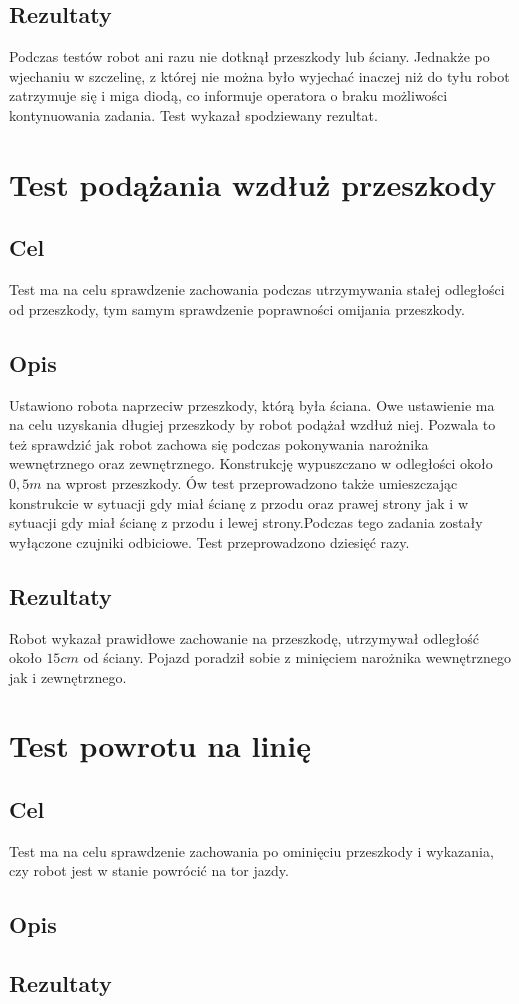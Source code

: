 \subsection{Rezultaty}
Podczas testów robot ani razu nie dotknął przeszkody lub ściany. Jednakże po wjechaniu w szczelinę, z której nie można było wyjechać inaczej niż do tyłu robot zatrzymuje się i miga diodą, co informuje operatora o braku możliwości kontynuowania zadania. Test wykazał spodziewany rezultat.

\section{Test podążania wzdłuż przeszkody}
\subsection{Cel}
Test ma na celu sprawdzenie zachowania podczas utrzymywania stałej odległości od przeszkody, tym samym sprawdzenie poprawności omijania przeszkody.
\subsection{Opis}
Ustawiono robota naprzeciw przeszkody, którą była ściana. Owe ustawienie ma na celu uzyskania długiej przeszkody by robot podążał wzdłuż niej. Pozwala to też sprawdzić jak robot zachowa się podczas pokonywania narożnika wewnętrznego oraz zewnętrznego. Konstrukcję wypuszczano w odległości około $0,5m$ na wprost przeszkody. Ów test przeprowadzono także umieszczając konstrukcie w sytuacji gdy miał ścianę z przodu oraz prawej strony jak i w sytuacji gdy miał ścianę z przodu i lewej strony.Podczas tego zadania zostały wyłączone czujniki odbiciowe. Test przeprowadzono dziesięć razy.
\subsection{Rezultaty}
Robot wykazał prawidłowe zachowanie na przeszkodę, utrzymywał odległość około $15cm$ od ściany. Pojazd poradził sobie z minięciem narożnika wewnętrznego jak i zewnętrznego.

\section{Test powrotu na linię}
\subsection{Cel}
Test ma na celu sprawdzenie zachowania po ominięciu przeszkody i wykazania, czy robot jest w stanie powrócić na tor jazdy.
\subsection{Opis}
\subsection{Rezultaty}